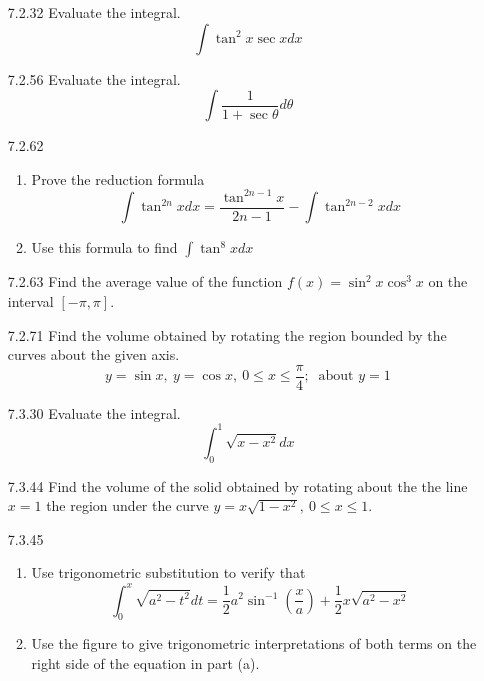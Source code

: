 \documentclass{article}
\begin{document}
\begin{enumerate}
\vspace{6cm}

\item[7.2.32]
    Evaluate the integral.
    \[
        \int \tan^{2}x \sec x dx
    \]
\newpage

\item[7.2.56]
    Evaluate the integral.
    \[
        \int \frac{1}{1 + \sec \theta} d\theta
    \]

\vspace{8cm}

\item[7.2.62]
    \begin{enumerate}
        \item Prove the reduction formula
        \[
            \int \tan^{2n} x dx = \frac{\tan^{2n-1} x }{2n-1}
            - \int \tan^{2n-2} x dx
        \]
        \item Use this formula to find $\displaystyle  \int \tan^{8}x dx$
    \end{enumerate}

\newpage

\item[7.2.63]
    Find the average value of the function $f(x) = \sin^{2}x \cos^{3}x$
    on the interval $[-\pi , \pi]$.

\vspace{6cm}

\item[7.2.71]
    Find the volume obtained by rotating the region bounded by the
    curves about the given axis.
    \[
        y = \sin x,\ y = \cos x,\
        0 \leqslant x \leqslant \frac{\pi}{4};\ \text{ about } y= 1
    \]

\vspace{6cm}

\item[7.3.30]
    Evaluate the integral.
    \[
        \int_{0}^{1} \sqrt{x-x^{2}} dx
    \]

\newpage

\item[7.3.44]
    Find the volume of the solid obtained by rotating about the
    the line $x=1$ the region under the curve
    $y = x \sqrt{1-x^{2}},\ 0 \leqslant x \leqslant 1$.

\vspace{7cm}

\item[7.3.45]
    \begin{enumerate}
        \item Use trigonometric substitution to verify that
        \[
            \int_{0}^{x} \sqrt{a^{2}-t^{2}}dt
            = \frac{1}{2} a^{2} \sin^{-1} \left(\frac{x}{a}\right)
            + \frac{1}{2}x \sqrt{a^{2}-x^{2}}
        \]
        \item Use the figure to give trigonometric interpretations of
            both terms on the right side of the equation in part (a).
    \end{enumerate}


\end{enumerate}
\end{document}

